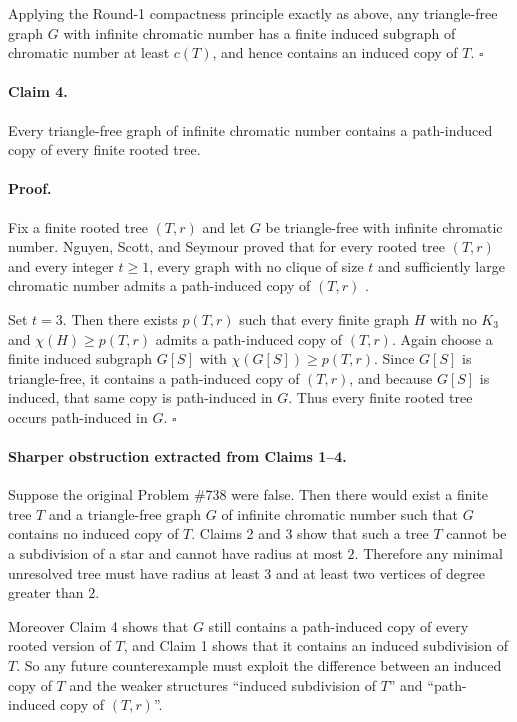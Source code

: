 Applying the Round-1 compactness principle exactly as above, any triangle-free graph $G$ with infinite chromatic number has a finite induced subgraph of chromatic number at least $c(T)$, and hence contains an induced copy of $T$. \hfill $\square$

\paragraph{Claim 4.} Every triangle-free graph of infinite chromatic number contains a path-induced copy of every finite rooted tree.

\paragraph{Proof.}
Fix a finite rooted tree $(T,r)$ and let $G$ be triangle-free with infinite chromatic number.
Nguyen, Scott, and Seymour proved that for every rooted tree $(T,r)$ and every integer $t\ge 1$, every graph with no clique of size $t$ and sufficiently large chromatic number admits a path-induced copy of $(T,r)$ \cite[Theorem~1.2 and Theorem~2.3]{NguyenScottSeymour24}.

Set $t=3$. Then there exists $p(T,r)$ such that every finite graph $H$ with no $K_3$ and $\chi(H)\ge p(T,r)$ admits a path-induced copy of $(T,r)$.
Again choose a finite induced subgraph $G[S]$ with $\chi(G[S])\ge p(T,r)$. Since $G[S]$ is triangle-free, it contains a path-induced copy of $(T,r)$, and because $G[S]$ is induced, that same copy is path-induced in $G$.
Thus every finite rooted tree occurs path-induced in $G$. \hfill $\square$

\paragraph{Sharper obstruction extracted from Claims 1--4.}
Suppose the original Problem \#738 were false. Then there would exist a finite tree $T$ and a triangle-free graph $G$ of infinite chromatic number such that $G$ contains no induced copy of $T$.
Claims 2 and 3 show that such a tree $T$ cannot be a subdivision of a star and cannot have radius at most $2$. Therefore any minimal unresolved tree must have radius at least $3$ and at least two vertices of degree greater than $2$.

Moreover Claim 4 shows that $G$ still contains a path-induced copy of every rooted version of $T$, and Claim 1 shows that it contains an induced subdivision of $T$. So any future counterexample must exploit the difference between an induced copy of $T$ and the weaker structures ``induced subdivision of $T$'' and ``path-induced copy of $(T,r)$''.

